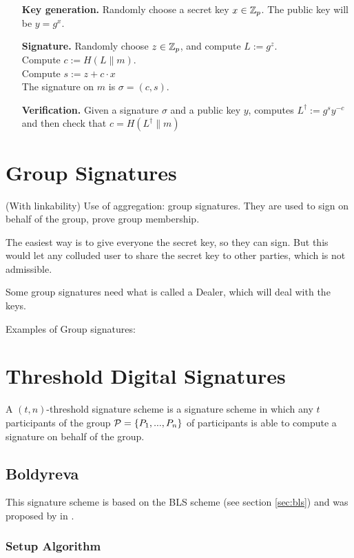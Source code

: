 \begin{itemize}[align = left, leftmargin=*]
	\item[\textbf{Key generation.}]	Randomly choose a secret key $x \in {\mathbb Z}_p$. The public key will be $y = g^x$.
	\item[\textbf{Signature.}] Randomly choose $z \in  {\mathbb Z}_p$, and compute $L := g^z$. \\
Compute $c := H(L \parallel m)$. \\
Compute $s := z + c \cdot x$ \\
The signature on $m$ is $\sigma = (c,s)$.
	\item[\textbf{Verification.}] Given a signature $\sigma$ and a public key $y$, computes $L^{\dagger} := g^{s} y^{-c}$ and then check that $c = H(L^{\dagger} \parallel m) $
\end{itemize}

\section{Group Signatures}
(With linkability)
Use of aggregation: group signatures. They are used to sign on behalf of the group, prove group membership.

The easiest way is to give everyone the secret key, so they can sign. But this would let any colluded user to share the secret key to other parties, which is not admissible.

Some group signatures need what is called a Dealer, which will deal with the keys.

Examples of Group signatures:

\section{Threshold Digital Signatures}
A $(t,n)$-threshold signature scheme is a signature scheme in which any $t$ participants of the group ${\mathcal P} = \{P_1, ..., P_n \}$ of participants is able to compute a signature on behalf of the group.

\subsection{Boldyreva}
\label{sec:shamir_sig}

This signature scheme is based on the BLS scheme (see section \ref{sec:bls}) and was proposed by \citeauthor{Boldyreva03} in \cite{Boldyreva03}.

\subsubsection*{Setup Algorithm}

